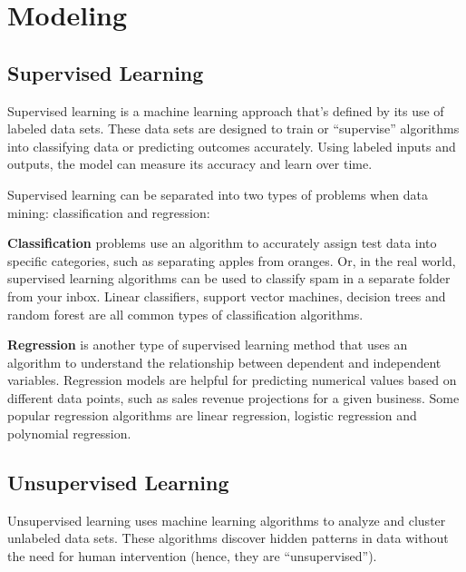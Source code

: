 	\chapter{Modeling}
	\section{Supervised Learning}
Supervised learning is a machine learning approach that's defined by its use of labeled data sets. These data sets are designed to train or ``supervise'' algorithms into classifying data or predicting outcomes accurately. Using labeled inputs and outputs, the model can measure its accuracy and learn over time.

Supervised learning can be separated into two types of problems when data mining: classification and regression:
	\begin{bulletedlist}
		\item \textbf{Classification} problems use an algorithm to accurately assign test data into specific categories, such as separating apples from oranges. Or, in the real world, supervised learning algorithms can be used to classify spam in a separate folder from your inbox. Linear classifiers, support vector machines, decision trees and random forest are all common types of classification algorithms.
		\item \textbf{Regression} is another type of supervised learning method that uses an algorithm to understand the relationship between dependent and independent variables. Regression models are helpful for predicting numerical values based on different data points, such as sales revenue projections for a given business. Some popular regression algorithms are linear regression, logistic regression and polynomial regression.
	\end{bulletedlist}

	\section{Unsupervised Learning}
Unsupervised learning uses machine learning algorithms to analyze and cluster unlabeled data sets. These algorithms discover hidden patterns in data without the need for human intervention (hence, they are ``unsupervised'').

